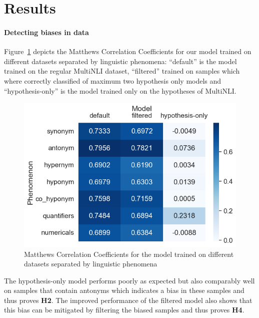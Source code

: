 \section{Results} \label{sec:results}

\paragraph{Detecting biases in data}
Figure~\ref{fig:metric-heatmap-phenomena-mcc} depicts the Matthews Correlation Coefficients for our model trained on different datasets separated by linguistic phenomena: \enquote{default} is the model trained on the regular \ac{MultiNLI} dataset, \enquote{filtered} trained on samples which where correctly classified of maximum two hypothesis only models and \enquote{hypothesis-only} is the model trained only on the hypotheses of \ac{MultiNLI}.

\begin{figure}[ht]
    \centering
    \includegraphics[width=0.9\columnwidth]{./images/metric_heatmaps_phenomena/important_words/matthews_correlation.png}
    \caption{Matthews Correlation Coefficients for the model trained on different datasets separated by linguistic phenomena}
    \label{fig:metric-heatmap-phenomena-mcc}
\end{figure}

The hypothesis-only model performs poorly as expected but also comparably well on samples that contain antonyms which indicates a bias in these samples and thus proves \textbf{H2}. The improved performance of the filtered model also shows that this bias can be mitigated by filtering the biased samples and thus proves \textbf{H4}.

